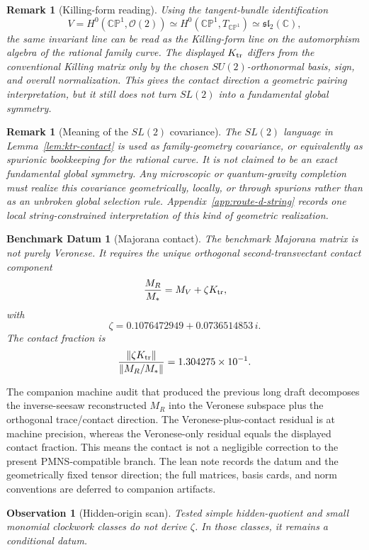 \documentclass[
  aps,
  prd,
  preprint,
  nofootinbib,
  superscriptaddress,
  longbibliography
]{revtex4-2}
\newcommand{\CP}{\mathbb{CP}}
\newcommand{\cO}{\mathcal{O}}
\newtheorem{datum}[theorem]{Benchmark Datum}
\newtheorem{observation}[theorem]{Observation}
\newtheorem{remark}[theorem]{Remark}
\begin{document}
\begin{remark}[Killing-form reading]
Using the tangent-bundle identification
\[
  V=H^0(\CP^1,\cO(2))\simeq H^0(\CP^1,T_{\CP^1})
  \simeq \mathfrak{sl}_2(\mathbb C),
\]
the same invariant line can be read as the Killing-form line on the
automorphism algebra of the rational family curve.  The displayed
\(K_{\rm tr}\) differs from the conventional Killing matrix only by the chosen
\(SU(2)\)-orthonormal basis, sign, and overall normalization.  This gives the
contact direction a geometric pairing interpretation, but it still does not
turn \(SL(2)\) into a fundamental global symmetry.
\end{remark}

\begin{remark}[Meaning of the \(SL(2)\) covariance]
The \(SL(2)\) language in Lemma~\ref{lem:ktr-contact} is used as
family-geometry covariance, or equivalently as spurionic bookkeeping for the
rational curve.  It is not claimed to be an exact fundamental global symmetry.
Any microscopic or quantum-gravity completion must realize this covariance
geometrically, locally, or through spurions rather than as an unbroken global
selection rule.  Appendix~\ref{app:route-d-string} records one local
string-constrained interpretation of this kind of geometric realization.
\end{remark}

\begin{datum}[Majorana contact]
The benchmark Majorana matrix is not purely Veronese.  It requires the unique
orthogonal second-transvectant contact component
\[
  \frac{M_R}{M_*}=M_V+\zeta K_{\rm tr},
\]
with
\[
  \zeta=0.1076472949+0.0736514853\,i.
\]
The contact fraction is
\[
  \frac{\|\zeta K_{\rm tr}\|}{\|M_R/M_*\|}
  =1.304275\times10^{-1}.
\]
\end{datum}

The companion machine audit that produced the previous long draft decomposes
the inverse-seesaw reconstructed \(M_R\)
into the Veronese subspace plus the orthogonal trace/contact direction.  The
Veronese-plus-contact residual is at machine precision, whereas the
Veronese-only residual equals the displayed contact fraction.  This means the
contact is not a negligible correction to the present PMNS-compatible branch.
The lean note records the datum and the geometrically fixed tensor direction;
the full matrices, basis cards, and norm conventions are deferred to companion
artifacts.

\begin{observation}[Hidden-origin scan]
Tested simple hidden-quotient and small monomial clockwork classes do not
derive \(\zeta\).  In those classes, it remains a conditional datum.
\end{observation}
\end{document}
